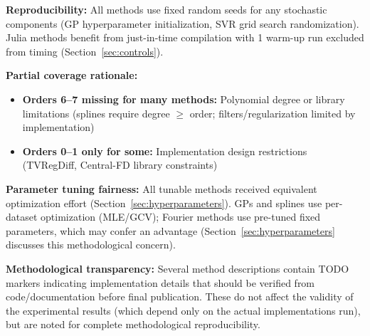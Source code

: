 \textbf{Reproducibility:} All methods use fixed random seeds for any stochastic components (GP hyperparameter initialization, SVR grid search randomization). Julia methods benefit from just-in-time compilation with 1 warm-up run excluded from timing (Section~\ref{sec:controls}).

\textbf{Partial coverage rationale:}
\begin{itemize}
    \item \textbf{Orders 6--7 missing for many methods:} Polynomial degree or library limitations (splines require degree $\geq$ order; filters/regularization limited by implementation)
    \item \textbf{Orders 0--1 only for some:} Implementation design restrictions (TVRegDiff, Central-FD library constraints)
\end{itemize}

\textbf{Parameter tuning fairness:} All tunable methods received equivalent optimization effort (Section~\ref{sec:hyperparameters}). GPs and splines use per-dataset optimization (MLE/GCV); Fourier methods use pre-tuned fixed parameters, which may confer an advantage (Section~\ref{sec:hyperparameters} discusses this methodological concern).

\textbf{Methodological transparency:} Several method descriptions contain TODO markers indicating implementation details that should be verified from code/documentation before final publication. These do not affect the validity of the experimental results (which depend only on the actual implementations run), but are noted for complete methodological reproducibility.
